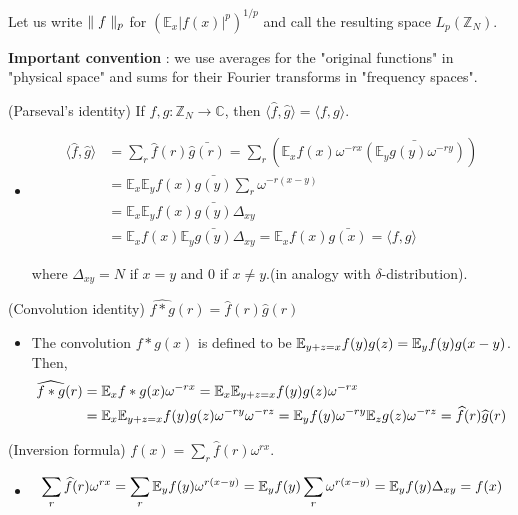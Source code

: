\documentclass[10pt,a4paper]{report}
\renewcommand{\hat}{\widehat}
\begin{document}
Let us write $\parallel f \parallel_{p}$ for $(\mathbb{E}_x |f(x)|^p)^{1/p}$ and call the resulting space $L_p(\mathbb{Z}_N)$.
\s

\textbf{Important convention} : we use averages for the "original functions" in "physical space" and sums for their Fourier transforms in "frequency spaces".
\s

 (Parseval's identity) If $f,g:\mathbb{Z}_N \rightarrow \mathbb{C}$, then $\langle \hat{f},\hat{g}\rangle =\langle f,g\rangle$.
\begin{itemize}
\item[ ] \pf
\begin{align*}
\langle \hat{f},\hat{g} \rangle &= \sum_{r} \hat{f}(r) \bar{\hat{g}(r)} = \sum_r (\mathbb{E}_x f(x)\omega^{-rx} \bar{(\mathbb{E}_y g(y) \omega^{-ry})} ) \\
&= \mathbb{E}_x \mathbb{E}_y f(x)\bar{g(y)} \sum_r \omega^{-r(x-y)} \\
&= \mathbb{E}_x \mathbb{E}_y f(x)\bar{g(y)} \Delta_{xy}\\
&=  \mathbb{E}_x f(x) \mathbb{E}_y \bar{g(y)} \Delta_{xy} = \mathbb{E}_x f(x)\bar{g(x)} = \langle f,g \rangle
\end{align*}

where $\Delta_{xy} = N$ if $x=y$ and $0$ if $x\neq y$.(in analogy with $\delta$-distribution).

\eop
\end{itemize}
\s

(Convolution identity) $\hat{f * g}(r) = \hat{f}(r) \hat{g}(r)$

\begin{itemize}
\item[ ]\pf The convolution $f*g(x)$ is defined to be $\mathbb{E}_{y+z =x} f(y) g(z) = \mathbb{E}_y f(y)g(x-y)$. Then,
\begin{align*}
\hat{f * g}(r) &= \avg_x f*g(x) \omega^{-rx} = \avg_x \avg_{y+z =x} f(y) g(z) \omega^{-rx} \\
&= \avg_x \avg_{y+z=x} f(y) g(z) \omega^{-ry}\omega^{-rz} = \avg_y f(y) \omega^{-ry} \avg_{z} g(z) \omega^{-rz} = \hat{f}(r) \hat{g}(r)
\end{align*}
\eop
\end{itemize} 
\s

(Inversion formula)  $f(x) = \sum_{r} \hat{f}(r)\omega^{rx}$.
\begin{itemize}
\item[ ] \pf
\begin{align*}
\sum_{r} \hat{f}(r) \omega^{rx} = \sum_r \avg_y f(y) \omega^{r(x-y)} = \avg_y f(y) \sum_r \omega^{r(x-y)} = \avg_y f(y) \Delta_{xy}  = f(x)
\end{align*}
\eop

\end{itemize}
\s
\end{document}
